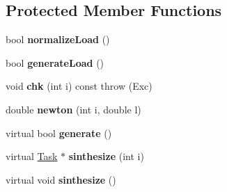 \subsection*{Protected Member Functions}
\begin{DoxyCompactItemize}
\item 
bool {\bfseries normalize\+Load} ()\hypertarget{classRTSim_1_1RandomTaskSetFactory_aa2f43cead6c23946699d31ca5b52106b}{}\label{classRTSim_1_1RandomTaskSetFactory_aa2f43cead6c23946699d31ca5b52106b}

\item 
bool {\bfseries generate\+Load} ()\hypertarget{classRTSim_1_1RandomTaskSetFactory_a7fd4fa39dae8b3733aaf633fa693f9af}{}\label{classRTSim_1_1RandomTaskSetFactory_a7fd4fa39dae8b3733aaf633fa693f9af}

\item 
void {\bfseries chk} (int i) const   throw (\+Exc)\hypertarget{classRTSim_1_1RandomTaskSetFactory_a28c84ec3a3b7fda28eb47ad7427213b9}{}\label{classRTSim_1_1RandomTaskSetFactory_a28c84ec3a3b7fda28eb47ad7427213b9}

\item 
double {\bfseries newton} (int i, double l)\hypertarget{classRTSim_1_1RandomTaskSetFactory_ab9a5fe2d1f6c17694cfb19b4d4df3e76}{}\label{classRTSim_1_1RandomTaskSetFactory_ab9a5fe2d1f6c17694cfb19b4d4df3e76}

\item 
virtual bool {\bfseries generate} ()\hypertarget{classRTSim_1_1RandomTaskSetFactory_a956a41a73bd16f77fc6d61b8291c12f0}{}\label{classRTSim_1_1RandomTaskSetFactory_a956a41a73bd16f77fc6d61b8291c12f0}

\item 
virtual \hyperlink{classRTSim_1_1Task}{Task} $\ast$ {\bfseries sinthesize} (int i)\hypertarget{classRTSim_1_1RandomTaskSetFactory_a75e53eb49a2639b74021937b7363b391}{}\label{classRTSim_1_1RandomTaskSetFactory_a75e53eb49a2639b74021937b7363b391}

\item 
virtual void {\bfseries sinthesize} ()\hypertarget{classRTSim_1_1RandomTaskSetFactory_a26f98fe581ea1975b61998fccddc6255}{}\label{classRTSim_1_1RandomTaskSetFactory_a26f98fe581ea1975b61998fccddc6255}

\end{DoxyCompactItemize}
